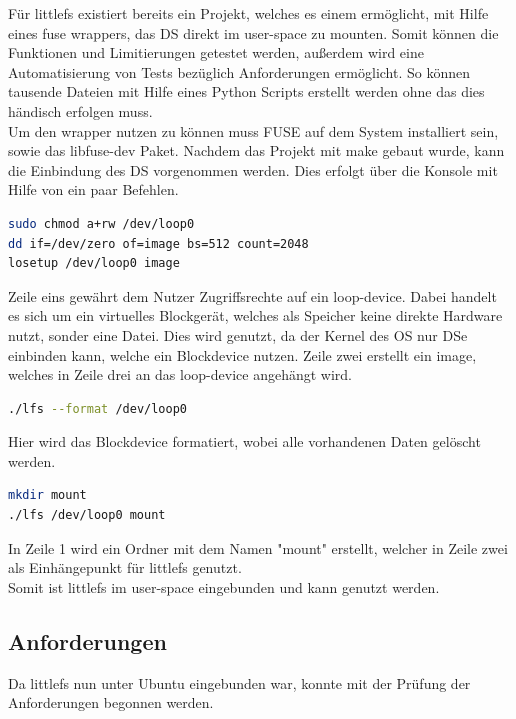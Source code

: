 Für littlefs existiert bereits ein Projekt, welches es einem ermöglicht, mit Hilfe eines fuse wrappers, das \acl{DS} direkt im user-space zu mounten.
Somit können die Funktionen und Limitierungen getestet werden, außerdem wird eine Automatisierung von Tests bezüglich Anforderungen ermöglicht.
So können tausende Dateien mit Hilfe eines Python Scripts erstellt werden ohne das dies händisch erfolgen muss.\\

Um den wrapper nutzen zu können muss FUSE auf dem System installiert sein, sowie das libfuse-dev Paket.
Nachdem das Projekt mit make gebaut wurde, kann die Einbindung des \acl{DS} vorgenommen werden.
Dies erfolgt über die Konsole mit Hilfe von ein paar Befehlen.

\begin{lstlisting}[language=bash]
sudo chmod a+rw /dev/loop0
dd if=/dev/zero of=image bs=512 count=2048
losetup /dev/loop0 image
\end{lstlisting}
Zeile eins gewährt dem Nutzer Zugriffsrechte auf ein loop-device.
Dabei handelt es sich um ein virtuelles Blockgerät, welches als Speicher keine direkte Hardware nutzt, sonder eine Datei.
Dies wird genutzt, da der Kernel des \acl{OS} nur \acl{DS}e einbinden kann, welche ein Blockdevice nutzen.
Zeile zwei erstellt ein image, welches in Zeile drei an das loop-device angehängt wird.\\

\begin{lstlisting}[language=bash]
./lfs --format /dev/loop0
\end{lstlisting}
Hier wird das Blockdevice formatiert, wobei alle vorhandenen Daten gelöscht werden.\\

\begin{lstlisting}[language=bash]
mkdir mount
./lfs /dev/loop0 mount
\end{lstlisting}
In Zeile 1 wird ein Ordner mit dem Namen "mount" erstellt, welcher in Zeile zwei als Einhängepunkt für littlefs genutzt.\\

Somit ist littlefs im user-space eingebunden und kann genutzt werden.\\


\subsection{Anforderungen}
\label{section:anforderungen}
Da littlefs nun unter Ubuntu eingebunden war, konnte mit der Prüfung der Anforderungen begonnen werden.\\

